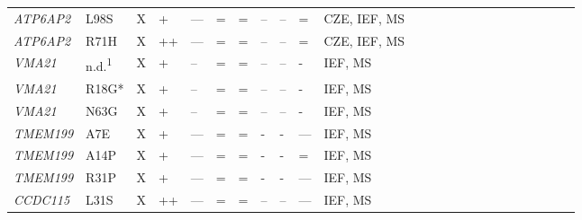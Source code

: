 \begin{landscape}
\begin{longtable}[c]{C{1.2cm}C{2cm}C{0.5cm}C{1.5cm}C{1.5cm}C{0.5cm}C{0.5cm}C{0.5cm}C{0.5cm}C{1.5cm}C{1.5cm}C{1.5cm}c c c c c c c c c c c c}
        \emph{ATP6AP2} & L98S & X                       & +                                      & ---                                 & =   & =      & --   & --  & =                                  & CZE, IEF, MS                       & \cite{rujano_mutations_2017} \\
        \emph{ATP6AP2} & R71H & X                       & ++                                      & ---                                 & =   & =      & --   & --  & =                                  & CZE, IEF, MS                       & \cite{rujano_mutations_2017} \\
        \emph{VMA21} & n.d.\textsuperscript{1} & X                       & +                                      & --                                 & =   & =      & --   & --  & -                                  & IEF, MS                       & \cite{cannata_serio_mutations_2020} \\
        \emph{VMA21} & R18G* & X                       & +                                      & --                                 & =   & =      & --   & --  & -                                  & IEF, MS                       & \cite{cannata_serio_mutations_2020} \\
        \emph{VMA21} & N63G & X                       & +                                      & --                                 & =   & =      & --   & --  & -                                  & IEF, MS                       & \cite{cannata_serio_mutations_2020} \\  
        \emph{TMEM199} & A7E & X                       & +                                      & ---                                 & =   & =      & -   & -  & ---                                  & IEF, MS                       & \cite{jansen_tmem199_2016} \\
        \emph{TMEM199} & A14P & X                       & +                                      & ---                                 & =   & =      & -   & -  & =                                  & IEF, MS                       & \cite{jansen_tmem199_2016} \\
        \emph{TMEM199} & R31P & X                       & +                                      & ---                                 & =   & =      & -   & -  & ---                                  & IEF, MS                       & \cite{jansen_tmem199_2016} \\
        \emph{CCDC115} & L31S & X                       & ++                                      & ---                                 & =   & =      & --   & --  & ---                                  & IEF, MS                       & \cite{jansen_ccdc115_2016} \\

\end{longtable}
\end{landscape}
